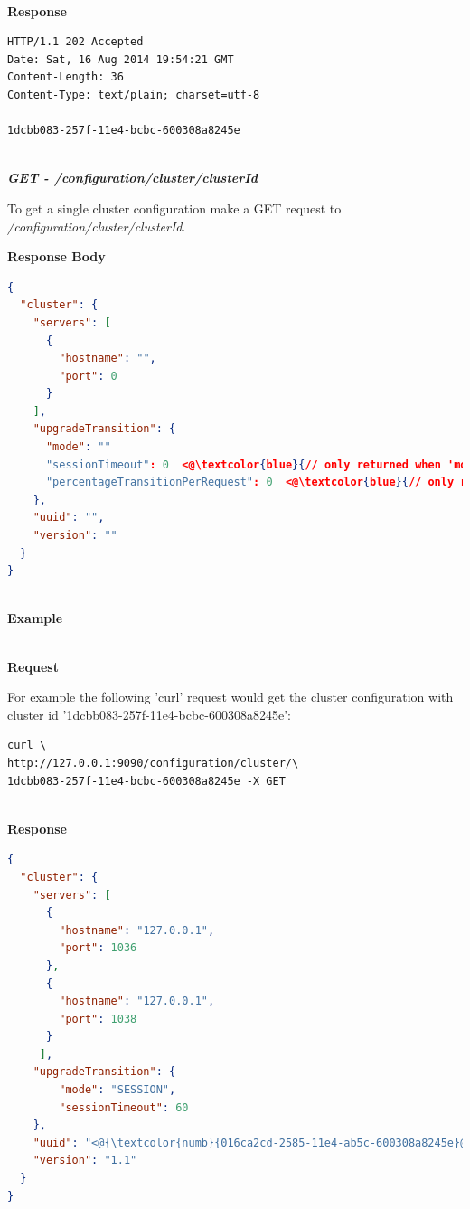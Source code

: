 \documentclass[a4paper,11pt,twoside]{report}
\begin{document}
\noindent \\
\textbf{Response}

\begin{lstlisting}[language=terminal]
HTTP/1.1 202 Accepted
Date: Sat, 16 Aug 2014 19:54:21 GMT
Content-Length: 36
Content-Type: text/plain; charset=utf-8
 
1dcbb083-257f-11e4-bcbc-600308a8245e
\end{lstlisting}

\noindent \\
\textit{\textbf{GET - /configuration/cluster/{clusterId}}}\bigskip

\noindent 
To get a single cluster configuration make a GET request to \textit{/configuration/cluster/{clusterId}}.\bigskip 

\noindent 
\textbf{Response Body}

\begin{lstlisting}[language=json]
{
  "cluster": {
    "servers": [
      {
        "hostname": "",
        "port": 0
      }
    ],
    "upgradeTransition": {
      "mode": ""
      "sessionTimeout": 0  <@\textcolor{blue}{// only returned when 'mode' is "SESSION" }@>
      "percentageTransitionPerRequest": 0  <@\textcolor{blue}{// only returned when 'mode' is "GRADUAL"}@>
    },
    "uuid": "",
    "version": ""
  }
} 
\end{lstlisting}

\noindent \\
\textbf{Example}

\noindent \\
\textbf{Request}

\noindent 
For example the following 'curl' request would get the cluster configuration with cluster id '1dcbb083-257f-11e4-bcbc-600308a8245e':\bigskip

\begin{lstlisting}[language=terminal]
curl \
http://127.0.0.1:9090/configuration/cluster/\
1dcbb083-257f-11e4-bcbc-600308a8245e -X GET
\end{lstlisting}

\noindent \\
\textbf{Response}

\begin{lstlisting}[language=json]
{
  "cluster": {
    "servers": [
      {
        "hostname": "127.0.0.1",
        "port": 1036
      },
      {
        "hostname": "127.0.0.1",
        "port": 1038
      }
     ],
    "upgradeTransition": {
        "mode": "SESSION",
        "sessionTimeout": 60
    },
    "uuid": "<@{\textcolor{numb}{016ca2cd-2585-11e4-ab5c-600308a8245e}@>",
    "version": "1.1"
  }
}
  
\end{lstlisting}
\end{document}
